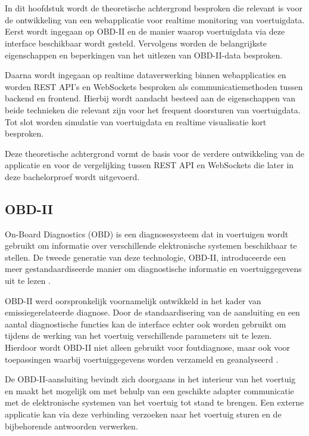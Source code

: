\chapter{}%
\label{ch:stand-van-zaken}
In dit hoofdstuk wordt de theoretische achtergrond besproken die relevant is
voor de ontwikkeling van een webapplicatie voor realtime monitoring van
voertuigdata. Eerst wordt ingegaan op OBD-II en de manier waarop voertuigdata
via deze interface beschikbaar wordt gesteld. Vervolgens worden de
belangrijkste eigenschappen en beperkingen van het uitlezen van OBD-II-data
besproken.

Daarna wordt ingegaan op realtime dataverwerking binnen webapplicaties en
worden REST API's en WebSockets besproken als communicatiemethoden tussen
backend en frontend. Hierbij wordt aandacht besteed aan de eigenschappen van
beide technieken die relevant zijn voor het frequent doorsturen van
voertuigdata. Tot slot worden simulatie van voertuigdata en realtime
visualisatie kort besproken.

Deze theoretische achtergrond vormt de basis voor de verdere ontwikkeling van
de applicatie en voor de vergelijking tussen REST API en WebSockets die later
in deze bachelorproef wordt uitgevoerd.


\section{OBD-II}
On-Board Diagnostics (OBD) is een diagnosesysteem dat in voertuigen wordt
gebruikt om informatie over verschillende elektronische systemen beschikbaar
te stellen. De tweede generatie van deze technologie, OBD-II, introduceerde een
meer gestandaardiseerde manier om diagnostische informatie en voertuiggegevens
uit te lezen \autocite{mccord2011automotive}.

OBD-II werd oorspronkelijk voornamelijk ontwikkeld in het kader van
emissiegerelateerde diagnose. Door de standaardisering van de aansluiting en
een aantal diagnostische functies kan de interface echter ook worden gebruikt
om tijdens de werking van het voertuig verschillende parameters uit te lezen.
Hierdoor wordt OBD-II niet alleen gebruikt voor foutdiagnose, maar ook voor
toepassingen waarbij voertuiggegevens worden verzameld en geanalyseerd
\autocite{RIMPAS202055,Pmc2025}.

De OBD-II-aansluiting bevindt zich doorgaans in het interieur van het voertuig
en maakt het mogelijk om met behulp van een geschikte adapter communicatie met
de elektronische systemen van het voertuig tot stand te brengen. Een externe
applicatie kan via deze verbinding verzoeken naar het voertuig sturen en de
bijbehorende antwoorden verwerken.

